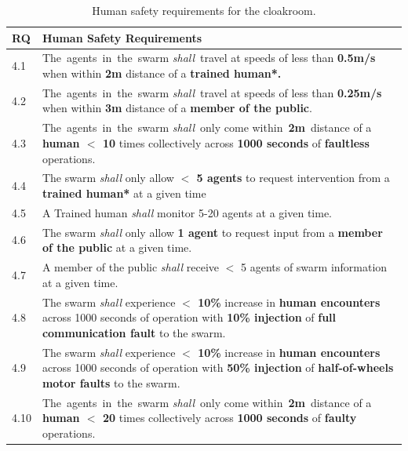 \documentclass[runningheads]{llncs}
\begin{document}
\tiny
\begin{table}[!h]
	\centering
	\begin{tabular}{p{6mm} p{116mm}}
		RQ & \textbf{Human Safety Requirements} \\
		\hline
		4.1 & The agents in the swarm \emph{shall} travel at speeds of less than \textbf{0.5m/s} when within \textbf{2m} distance of a \textbf{trained human*.}
		\\ 
		\hline
		4.2 & The agents in the swarm \emph{shall} travel at speeds of less than \textbf{0.25m/s} when within \textbf{3m} distance of a \textbf{member of the public}.
		\\ 
		\hline
		4.3 & The agents in the swarm \emph{shall} only come within \textbf{2m} distance of a \textbf{human $<$ 10} times collectively across \textbf{1000 seconds} of \textbf{faultless} operations.
		\\ 
		\hline
		4.4 & The swarm \emph{shall} only allow \textbf{$<$ 5 agents} to request intervention from a \textbf{trained human*} at a given time
		\\ 
		\hline
		4.5 & A Trained human \emph{shall} monitor 5-20 agents at a given time.
		\\ 
		\hline
		4.6 & The swarm \emph{shall} only allow \textbf{1 agent} to request input from a \textbf{member of the public} at a given time.
		\\ 
		\hline
		4.7 & A member of the public \emph{shall} receive $<$ 5 agents of swarm information at a given time.
		\\ 
		\hline
		4.8 & The swarm \emph{shall} experience \textbf{$<$ 10\%} increase in \textbf{human encounters} across 1000 seconds of operation with \textbf{10\% injection} of \textbf{full communication fault} to the swarm. \\
		\hline
		4.9 & The swarm \emph{shall} experience \textbf{$<$ 10\%} increase in \textbf{human encounters }across 1000 seconds of operation with \textbf{50\% injection} of \textbf{half-of-wheels motor faults} to the swarm.\\
		\hline
		4.10 & The agents in the swarm \emph{shall} only come within \textbf{2m} distance of a \textbf{human $<$ 20} times collectively across \textbf{1000 seconds} of \textbf{faulty} operations.
		\\		[1ex] 		
		\hline
	\end{tabular}
	\caption{\label{tab:human-s}Human safety requirements for the cloakroom.}
		\vspace{-4ex}
\end{table}   
\normalsize
\end{document}
